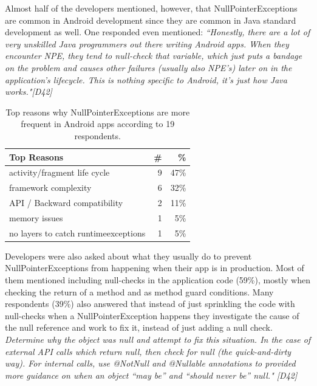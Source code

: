 Almost half of the developers mentioned, however, that NullPointerExceptions are common in Android development since they are common in Java standard development as well. One responded even mentioned: \emph{``Honestly, there are a lot of very unskilled Java programmers out there writing Android apps. When they encounter NPE, they tend to null-check that variable, which just puts a bandage on the problem and causes other failures (usually also NPE's) later on in the application's lifecycle. This is nothing specific to Android, it's just how Java works."[D42]}

\begin{table}
\scriptsize
\centering
\begin{tabular}{lrr}
\hline
\bfseries{Top Reasons} & \bfseries{\#} & \bfseries{\%} \\
\hline
activity/fragment life cycle  &	9 &	47\% \\
framework complexity	& 6 &	32\% \\
API / Backward compatibility	& 2 &	11\% \\
memory issues & 	1 &	5\% \\
no layers to catch runtimeexceptions	& 1 &	5\% \\
\hline
\end{tabular}
\caption{Top reasons why NullPointerExceptions are more frequent in Android apps according to 19 respondents.}
\label{tab:causenull}
\end{table}

Developers were also asked about what they usually do to prevent NullPointerExceptions from happening when their app is in production. Most of them mentioned including null-checks in the application code (59\%), mostly when checking the return of a method and as method guard conditions. Many respondents (39\%) also answered that instead of just sprinkling the code with null-checks when a NullPointerException happens they investigate the cause of the null reference and work to fix it, instead of just adding a null check. \emph{Determine why the object was null and attempt to fix this situation. In the case of external API calls which return null, then check for null (the quick-and-dirty way). For internal calls, use @NotNull and @Nullable annotations to provided more guidance on when an object ``may be'' and ``should never be'' null." [D42]}

